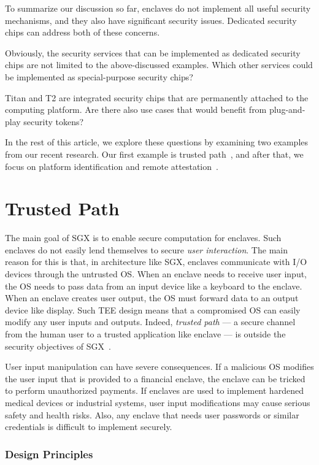 \documentclass[letterpaper,twocolumn,10pt]{article}
\begin{document}
To summarize our discussion so far, enclaves do not implement all useful security mechanisms, and they also have significant security issues. Dedicated security chips can address both of these concerns. 

Obviously, the security services that can be implemented as dedicated security chips are not limited to the above-discussed examples. Which other services could be implemented as special-purpose security chips? 

Titan and T2 are integrated security chips that are permanently attached to the computing platform. Are there also use cases that would benefit from plug-and-play security tokens?

In the rest of this article, we explore these questions by examining two examples from our recent research. Our first example is trusted path~\cite{protection}, and after that, we focus on platform identification and remote attestation~\cite{proximitee}. 



\section*{Trusted Path}

The main goal of SGX is to enable secure computation for enclaves. Such enclaves do not easily lend themselves to secure \emph{user interaction}. The main reason for this is that, in architecture like SGX, enclaves communicate with I/O devices through the untrusted OS. When an enclave needs to receive user input, the OS needs to pass data from an input device like a keyboard to the enclave. When an enclave creates user output, the OS must forward data to an output device like display. Such TEE design means that a compromised OS can easily modify any user inputs and outputs.
Indeed, \emph{trusted path} --- a secure channel from the human user to a trusted application like enclave --- is outside the security objectives of SGX~\cite{mckeen2013}. 

User input manipulation can have severe consequences. If a malicious OS modifies the user input that is provided to a financial enclave, the enclave can be tricked to perform unauthorized payments. If enclaves are used to implement hardened medical devices or industrial systems, user input modifications may cause serious safety and health risks. Also, any enclave that needs user passwords or similar credentials is difficult to implement securely.


\subsubsection*{Design Principles}
\end{document}
